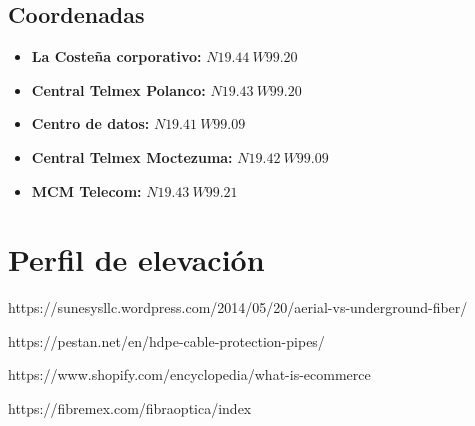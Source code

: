 \documentclass[12pt,letterpaper]{article}
\begin{document}
\subsection{Coordenadas}
\begin{itemize}
    \item \textbf{La Costeña corporativo:} $N 19.44 \ W 99.20$
    \item \textbf{Central Telmex Polanco:} $N 19.43 \ W 99.20$
    \item \textbf{Centro de datos:} $N 19.41 \ W 99.09$
    \item \textbf{Central Telmex Moctezuma:} $N 19.42 \ W 99.09$
    \item \textbf{MCM Telecom:} $N 19.43 \ W 99.21$
\end{itemize}

\section{Perfil de elevación }

\begin{thebibliography}{20}
    https://sunesysllc.wordpress.com/2014/05/20/aerial-vs-underground-fiber/

    https://pestan.net/en/hdpe-cable-protection-pipes/
    

    https://www.shopify.com/encyclopedia/what-is-ecommerce

    https://fibremex.com/fibraoptica/index
\end{thebibliography}
\end{document}
